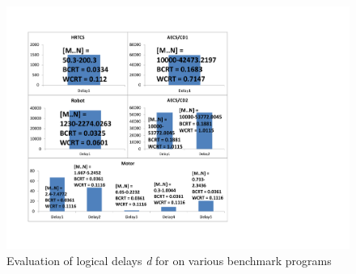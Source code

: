 \begin{figure}
\centering
	\includegraphics[trim=2cm 2cm 2cm 2cm,scale=0.5]{table2}
\caption{Evaluation of logical delays \emph{d} for on various benchmark programs}\label{fig:comparison}
\end{figure}
